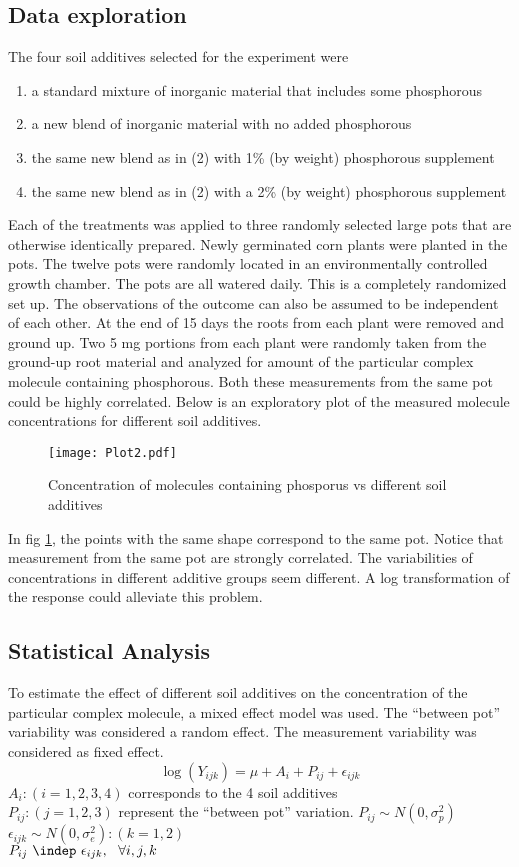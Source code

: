 \documentclass[11pt,a4paper]{article}
\begin{document}
\subsection*{Data exploration}
The four soil additives selected for the experiment were
\begin{enumerate}
\item a standard mixture of inorganic material that includes some phosphorous
\item a new blend of inorganic material with no added phosphorous
\item the same new blend as in (2) with 1\% (by weight) phosphorous supplement
\item the same new blend as in (2) with a 2\% (by weight) phosphorous supplement
\end{enumerate}
Each of the treatments was applied to three randomly selected large pots that are otherwise identically prepared. Newly germinated corn plants were planted in the pots. The twelve pots were randomly located in an environmentally controlled growth chamber. The pots are all watered daily. This is a completely randomized set up. The observations of the outcome can also be assumed to be independent of each other. At the end of 15 days the roots from each plant were removed and ground up. Two 5 mg portions from each plant were randomly taken from the ground-up root material and analyzed for amount of the particular complex molecule containing phosphorous. Both these measurements from the same pot could be highly correlated. Below is an exploratory plot of the measured molecule concentrations for different soil additives. 
\begin{figure}[H]
\begin{center}
\texttt{[image: Plot2.pdf]}
\end{center}
\caption{Concentration of molecules containing phosporus vs different soil additives}
\label{fig:Fig2_1}
\end{figure}
In fig \ref{fig:Fig2_1}, the points with the same shape correspond to the same pot. Notice that measurement from the same pot are strongly correlated. The variabilities of concentrations in different additive groups seem different. A log transformation of the response could alleviate this problem. 

\subsection*{Statistical Analysis}
To estimate the effect of different soil additives on the concentration of the particular complex molecule, a mixed effect model was used. The ``between pot'' variability was considered a random effect. The measurement variability was considered as fixed effect. 
\[ \log(Y_{ijk}) = \mu + A_i + P_{ij} + \epsilon_{ijk} \]
$A_i: (i = 1, 2, 3, 4)$ corresponds to the 4 soil additives \\
$P_{ij}: (j = 1, 2, 3)$ represent the ``between pot'' variation. $P_{ij} \sim N(0, \sigma_p^2)$ \\
$\epsilon_{ijk} \sim N(0, \sigma_e^2): (k = 1, 2)$ \\
$P_{ij}\  \indep\  \epsilon_{ijk},\ \  \forall i, j, k$ \\
\end{document}
